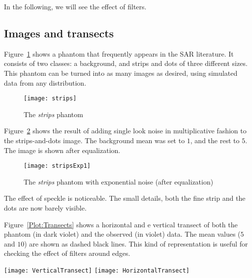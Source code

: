 In the following, we will see the effect of filters.

\subsection{Images and transects}

Figure~\ref{Image:Strips} shows a phantom that frequently appears in the SAR literature\cite{Petty:LAAR:ProtocoloLee}.
It consists of two classes: a background, and strips and dots of three different sizes.
This phantom can be turned into as many images as desired, using simulated data from any distribution.

\begin{figure}[hbt]
\texttt{[image: strips]}
\caption{The \textit{strips} phantom}\label{Image:Strips}
\end{figure}

Figure~\ref{Image:Strips1LookExp} shows the result of adding single look noise in multiplicative fashion to the strips-and-dots image.
The background mean was set to $1$, and the rest to $5$.
The image is shown after equalization.

\begin{figure}[hbt]
	\texttt{[image: stripsExp1]}
	\caption{The \textit{strips} phantom with exponential noise (after equalization)}\label{Image:Strips1LookExp}
\end{figure}

The effect of speckle is noticeable.
The small details, both the fine strip and the dots are now barely visible.

Figure~\ref{Plot:Transects} shows a horizontal and e vertical transect of both the phantom (in dark violet) and the observed (in violet) data.
The mean values ($5$ and $10$) are shown as dashed black lines.
This kind of representation is useful for checking the effect of filters around edges.

\begin{figure*}[hbt]
	\texttt{[image: VerticalTransect]}
	\texttt{[image: HorizontalTransect]}
	\caption{Vertical (left) and horizontal (right) transects}\label{Plot:Transects}
\end{figure*}
